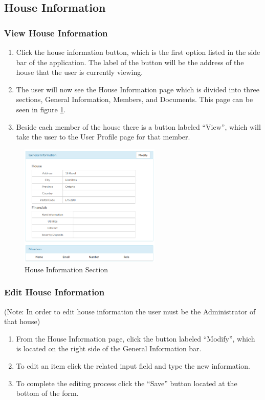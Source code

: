 \documentclass[12pt]{article}
\begin{document}
    \subsection{House Information} %
    \subsubsection{View House Information}
    \begin{enumerate}
        \item Click the house information button, which is the first option listed in the side bar of the application. The label of the button will be the address of the house that the user is currently viewing.
        \item The user will now see the House Information page which is divided into three sections, General Information, Members, and Documents. This page can be seen in figure \ref{fig:house_information}.
        \item Beside each member of the house there is a button labeled ``View'', which will take the user to the User Profile page for that member.
    \end{enumerate}

    \begin{figure}
        \centering
        \includegraphics[width=0.6\textwidth]{house_information}
        \caption{House Information Section}
        \label{fig:house_information}
    \end{figure}

    \subsubsection{Edit House Information}
    (Note: In order to edit house information the user must be the Administrator of that house)
    \begin{enumerate}
        \item From the House Information page, click the button labeled ``Modify'', which is located on the right side of the General Information bar.
        \item To edit an item click the related input field and type the new information.
        \item To complete the editing process click the ``Save'' button located at the bottom of the form.
    \end{enumerate}
\end{document}
